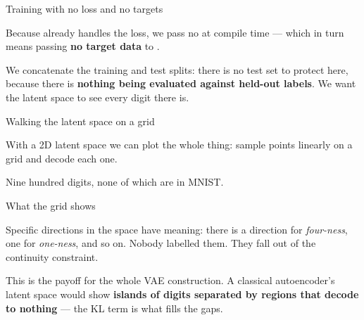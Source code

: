 \documentclass[aspectratio=169,11pt,t]{beamer}
\begin{document}
\begin{frame}[shrink=25]{Training with no loss and no targets}
{\fontsize{9.4}{12.6}\selectfont\color{fg2}Because  already handles the loss, we pass no  at compile time --- which in turn means passing \textbf{no target data} to .\par}\vskip 4pt
{\fontsize{9.4}{12.6}\selectfont\color{fg2}We concatenate the training and test splits: there is no test set to protect here, because there is \textbf{nothing being evaluated against held-out labels}. We want the latent space to see every digit there is.\par}\vskip 4pt
\end{frame}

\begin{frame}[shrink=25]{Walking the latent space on a grid}
{\fontsize{9.4}{12.6}\selectfont\color{fg2}With a 2D latent space we can plot the whole thing: sample points linearly on a grid and decode each one.\par}\vskip 4pt
{\fontsize{9.4}{12.6}\selectfont\color{fg2}Nine hundred digits, none of which are in MNIST.\par}\vskip 4pt
\end{frame}

\begin{frame}[shrink=25]{What the grid shows}
{\fontsize{9.4}{12.6}\selectfont\color{fg2}Specific directions in the space have meaning: there is a direction for \textit{four-ness}, one for \textit{one-ness}, and so on. Nobody labelled them. They fall out of the continuity constraint.\par}\vskip 4pt
\begin{iband}[amber]
This is the payoff for the whole VAE construction. A classical autoencoder's latent space would show \textbf{islands of digits separated by regions that decode to nothing} --- the KL term is what fills the gaps.
\end{iband}
\end{frame}

\end{document}
